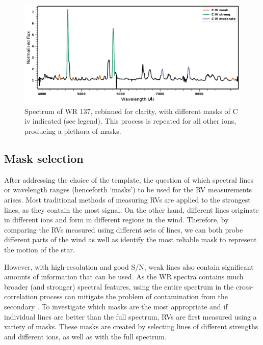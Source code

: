 \begin{figure}
    \centering
    \includegraphics[width=\hsize]{chapters/WC/image/LineStrengths.pdf}
    \caption{Spectrum of WR 137, rebinned for clarity, with different masks of C iv indicated (see legend). This process is repeated for all other ions, producing a plethora of masks.}
    \label{fig:line_strengths}
\end{figure}
\subsection{Mask selection}
After addressing the choice of the template, the question of which spectral lines or wavelength ranges (henceforth `masks') to be used for the RV measurements arises. Most traditional methods of measuring RVs are applied to the strongest lines, as they contain the most signal.
On the other hand, different lines originate in different ions and form in different regions in the wind. Therefore, by comparing the RVs measured using different sets of lines, we can both probe different parts of the wind as well as identify the most reliable mask to represent the motion of the star.

However, with high-resolution and good S/N, weak lines also contain significant amounts of information that can be used. As the WR spectra contains much broader (and stronger) spectral features, using the entire spectrum in the cross-correlation process can mitigate the problem of contamination from the secondary \citep{david-uraz_using_2012}. To investigate which masks are the most appropriate and if individual lines are better than the full spectrum, RVs are first measured using a variety of masks. These masks are created by selecting lines of different strengths and different ions, as well as with the full spectrum.

